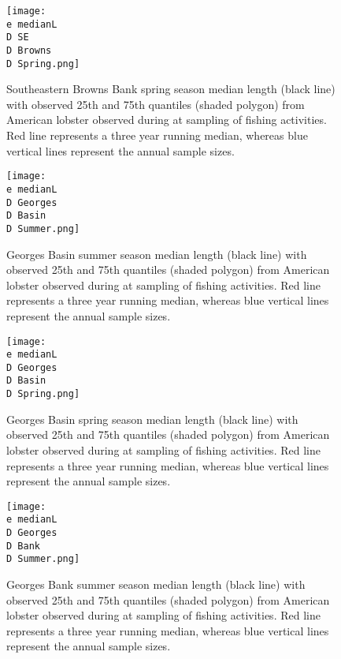 \documentclass[11pt]{article}
\newcommand{\D}{.}
\newcommand{\e}{/backup/bio_data/bio.lobster/figures/} %
\begin{document}
\begin{figure}

    \texttt{[image: \\e medianL\\D SE\\D Browns\\D Spring.png]}
    \caption{Southeastern Browns Bank spring season median length (black line) with observed 25th and 75th quantiles (shaded polygon) from American lobster observed during at sampling of fishing activities. Red line represents a three year running median, whereas blue vertical lines represent the annual sample sizes.}

\end{figure}

\begin{figure}

    \texttt{[image: \\e medianL\\D Georges\\D Basin\\D Summer.png]}
    \caption{Georges Basin summer season median length (black line) with observed 25th and 75th quantiles (shaded polygon) from American lobster observed during at sampling of fishing activities. Red line represents a three year running median, whereas blue vertical lines represent the annual sample sizes.}

\end{figure}

\begin{figure}

    \texttt{[image: \\e medianL\\D Georges\\D Basin\\D Spring.png]}
    \caption{Georges Basin spring season median length (black line) with observed 25th and 75th quantiles (shaded polygon) from American lobster observed during at sampling of fishing activities. Red line represents a three year running median, whereas blue vertical lines represent the annual sample sizes.}

\end{figure}

\begin{figure}

    \texttt{[image: \\e medianL\\D Georges\\D Bank\\D Summer.png]}
    \caption{Georges Bank summer season median length (black line) with observed 25th and 75th quantiles (shaded polygon) from American lobster observed during at sampling of fishing activities. Red line represents a three year running median, whereas blue vertical lines represent the annual sample sizes.}

\end{figure}


\clearpage



\end{document}
